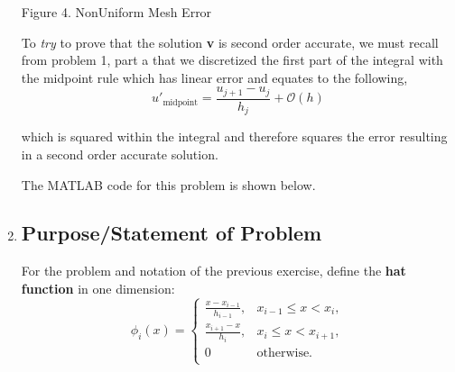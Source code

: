 \documentclass[11pt, oneside]{article}   	%
\begin{document}
\begin{enumerate}
\centerline {}
\centerline{Figure 4. NonUniform Mesh Error}

To \emph{try} to prove that the solution \textbf{v} is second order accurate, we must recall from problem 1, part a that we discretized the first part of the integral with the midpoint rule which has linear error and equates to the following,
\[
u'_{\text{midpoint}} = \frac{u_{j+1} - u_j}{h_j} + \mathcal{O}(h)
\]

which is squared within the integral and therefore squares the error resulting in a second order accurate solution.

\vspace{2mm}

The MATLAB code for this problem is shown below.





\item 
\subsection{Purpose/Statement of Problem}
For the problem and notation of the previous exercise, define the \textbf{hat function} in one dimension:
\[
\phi_i(x) = \begin{cases}
\frac{x - x_{i-1}}{h_{i-1}}, & x_{i-1} \leq x < x_i,\\
\frac{x_{i+1} -x}{h_i}, & x_i \leq x < x_{i+1},\\
0 & \text{otherwise.}\\
\end{cases}
\]


\end{enumerate}
\end{document}
